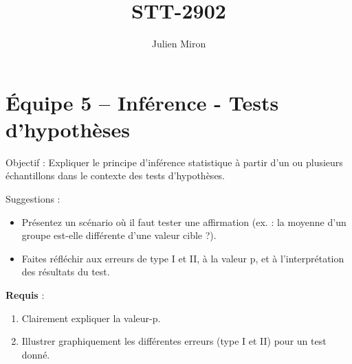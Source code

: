 \documentclass{article}
\title{STT-2902}
\author{Julien Miron}
\begin{document}
\section*{Équipe 5 – Inférence - Tests d'hypothèses}

Objectif : Expliquer le principe d’inférence statistique à partir d’un ou plusieurs échantillons dans le contexte des tests d'hypothèses.


\vspace{1cm}
Suggestions :
\begin{itemize}
    \item Présentez un scénario où il faut tester une affirmation (ex. : la moyenne d’un groupe est-elle différente d’une valeur cible ?).
    \item Faites réfléchir aux erreurs de type I et II, à la valeur p, et à l’interprétation des résultats du test.
\end{itemize}

\vspace{1cm}
\textbf{Requis} :
\begin{enumerate}
    \item Clairement expliquer la valeur-p.
    \item Illustrer graphiquement les différentes erreurs (type I et II) pour un test donné.
\end{enumerate}
\end{document}
